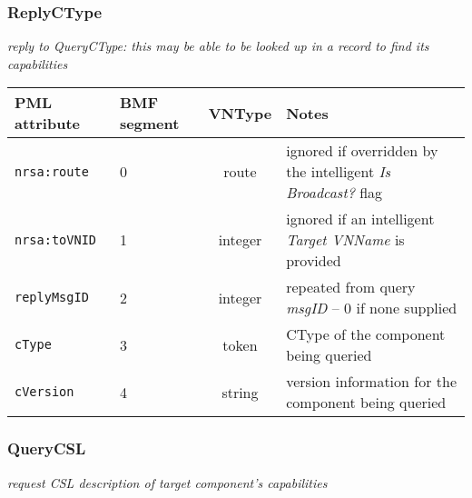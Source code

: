 \documentclass[pdftex,a4paper]{article}
\newcommand{\XMLfont}[1]{{\tt \small #1}}
\begin{document}
\subsubsection{ReplyCType}
{\em reply to QueryCType: this may be able to be looked up in a record
  to find its capabilities}

\begin{table}[!h]
  \begin{center}
    \label{tab:ReplyCType}
    \begin{tabular}{|l|p{13mm}|c|p{60mm}|}
      \hline

      \textbf{PML attribute} & \textbf{BMF segment} & \textbf{VNType}
      & \textbf{Notes} \\\hline

      \XMLfont{nrsa:route} & 0 & route & ignored if overridden by the
      intelligent {\em Is Broadcast?} flag \\ \hline

      \XMLfont{nrsa:toVNID} & 1 & integer & ignored if an intelligent {\em
      Target VNName} is provided \\\hline

      \XMLfont{replyMsgID} & 2 & integer & repeated from query {\em
      msgID} -- 0 if none supplied \\\hline

      \XMLfont{cType} & 3 & token & CType of the component being
      queried \\\hline

      \XMLfont{cVersion} & 4 & string & version information for
      the component being queried \\\hline

    \end{tabular}
  \end{center}
\end{table}

\clearpage

\subsubsection{QueryCSL}
{\em request CSL description of target component's capabilities}
\end{document}

